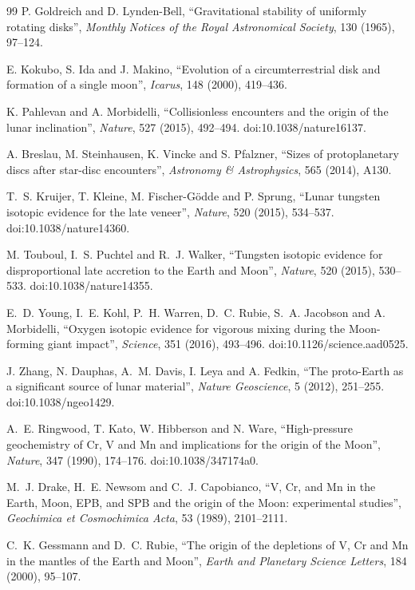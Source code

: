 \documentclass[11pt,a4paper,openany]{report}
\begin{document}
\begin{thebibliography}{99}
 P. Goldreich and D. Lynden-Bell, ``Gravitational stability of
uniformly rotating disks'', \emph{Monthly Notices of the Royal Astronomical Society}, 130 (1965),
97--124.

 E. Kokubo, S. Ida and J. Makino, ``Evolution of a circumterrestrial disk and
formation of a single moon'', \emph{Icarus}, 148 (2000), 419--436.

 K. Pahlevan and A. Morbidelli, ``Collisionless encounters and the
origin of the lunar inclination'', \emph{Nature}, 527 (2015), 492--494. doi:10.1038/nature16137.

 A. Breslau, M. Steinhausen, K. Vincke and S. Pfalzner, ``Sizes of
protoplanetary discs after star-disc encounters'', \emph{Astronomy \& Astrophysics}, 565 (2014),
A130.

 T.~S. Kruijer, T. Kleine, M. Fischer-Gödde and P. Sprung, ``Lunar tungsten
isotopic evidence for the late veneer'', \emph{Nature}, 520 (2015), 534--537.
doi:10.1038/nature14360.

 M. Touboul, I.~S. Puchtel and R.~J. Walker, ``Tungsten isotopic evidence for
disproportional late accretion to the Earth and Moon'', \emph{Nature}, 520 (2015), 530--533.
doi:10.1038/nature14355.

 E.~D. Young, I.~E. Kohl, P.~H. Warren, D.~C. Rubie, S.~A. Jacobson and
A. Morbidelli, ``Oxygen isotopic evidence for vigorous mixing during the Moon-forming giant
impact'', \emph{Science}, 351 (2016), 493--496. doi:10.1126/science.aad0525.

 J. Zhang, N. Dauphas, A.~M. Davis, I. Leya and A. Fedkin, ``The proto-Earth as
a significant source of lunar material'', \emph{Nature Geoscience}, 5 (2012), 251--255.
doi:10.1038/ngeo1429.

 A.~E. Ringwood, T. Kato, W. Hibberson and N. Ware, ``High-pressure
geochemistry of Cr, V and Mn and implications for the origin of the Moon'', \emph{Nature}, 347
(1990), 174--176. doi:10.1038/347174a0.

 M.~J. Drake, H.~E. Newsom and C.~J. Capobianco, ``V, Cr, and Mn in the Earth,
Moon, EPB, and SPB and the origin of the Moon: experimental studies'', \emph{Geochimica et
Cosmochimica Acta}, 53 (1989), 2101--2111.

 C.~K. Gessmann and D.~C. Rubie, ``The origin of the depletions of V,
Cr and Mn in the mantles of the Earth and Moon'', \emph{Earth and Planetary Science Letters}, 184
(2000), 95--107.


\end{thebibliography}
\end{document}
